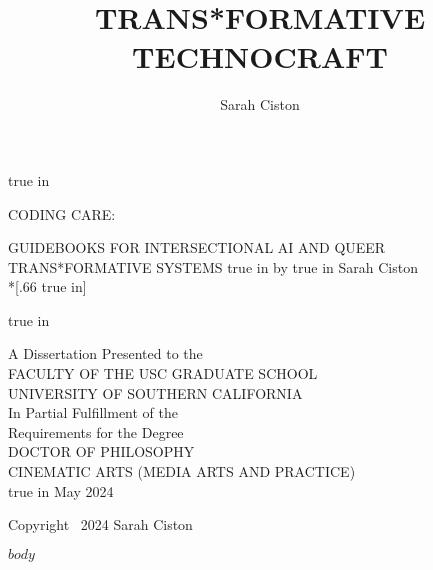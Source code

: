 \documentclass[11pt,oneside]{scrbook} %
\title{TRANS*FORMATIVE TECHNOCRAFT}
\author{Sarah Ciston}
\begin{document}
{}%
\pagestyle{empty}%
\begin{singlespace}%
    \hypersetup{hidelinks}
  \large  %
    \setcounter{page}{0}%
    \null
     true in
    \begin{center} 
    \begin{doublespace}
        CODING CARE: \par
        GUIDEBOOKS FOR INTERSECTIONAL AI AND QUEER TRANS*FORMATIVE SYSTEMS
       true in
      by%
       true in
      Sarah Ciston\\*[.66 true in]%
      \par
       true in
    \end{doublespace}
      A Dissertation Presented to the\\%
      FACULTY OF THE USC GRADUATE SCHOOL\\%
      UNIVERSITY OF SOUTHERN CALIFORNIA\\%
      In Partial Fulfillment of the\\%
      Requirements for the Degree\\%
      DOCTOR OF PHILOSOPHY\\%
      CINEMATIC ARTS (MEDIA ARTS AND PRACTICE)\\%
       true in
      May 2024%
    \end{center}%
    \par
    \vfill
          \noindent Copyright~ 2024 \hfill Sarah Ciston
    \end{singlespace}
\newpage
\renewcommand{\contentsname}{Table of Contents}
        \tableofcontents
        \listoffigures
    \newpage
    \pagestyle{plain}%
    \setcounter{page}{1}

\newpage

$body$
\end{document}
